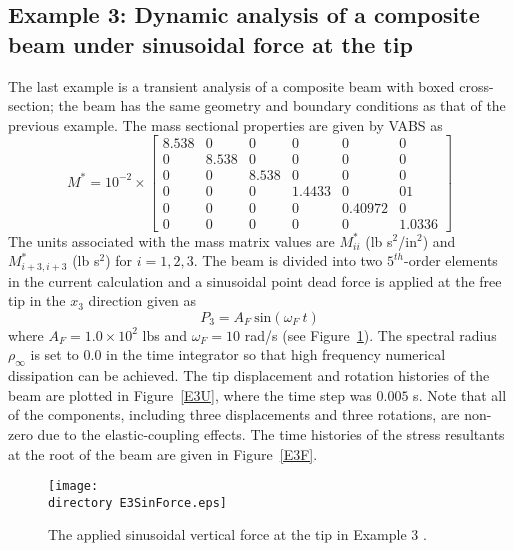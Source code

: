 \subsection{Example 3: Dynamic analysis of a composite beam under sinusoidal force at the tip}

The last example is a transient analysis of a composite beam with boxed
cross-section; the beam has the same
geometry and boundary conditions as that of the previous example. The mass
sectional properties are given by VABS \cite{Yu-etal:2002,Wang-Yu:2012} as
\begin{equation}
    \label{E3Mass}
    M^* = 10^{-2} \times \begin{bmatrix}
	8.538 & 0     & 0     & 0      & 0      & 0      \\
	0       & 8.538 & 0     & 0      & 0      & 0      \\
	0       & 0     & 8.538 & 0      & 0      & 0      \\
	0       & 0     & 0     & 1.4433  & 0  & 01 \\
	0       & 0     & 0     & 0  & 0.40972  &0 \\
	0       & 0     & 0     & 0 & 0 & 1.0336
\end{bmatrix}    
\end{equation}
The units associated with the mass matrix values are $M_{ii}^*$ (lb s$^2$/in$^2$) and $M_{i+3,i+3}^*$ (lb s$^2$) for $i = 1,2,3$. The beam is divided into two $5^{th}$-order elements in the current calculation and a sinusoidal point dead force is applied at the free tip in the $x_3$ direction given as
\begin{equation}
    \label{E3AppliedForce}
    P_3 = A_F~\text{sin}(\omega_F~t)
\end{equation}
where $A_F = 1.0 \times 10^2$ lbs and $\omega_F = 10$ rad/s (see
Figure~\ref{E3SinForce}). 
The spectral radius $\rho_\infty$ is set to $0.0$ in the time integrator so that high frequency numerical dissipation can be achieved. The tip displacement and rotation histories of the beam are plotted in
Figure~\ref{E3U}, where the time step was $0.005$ s. Note that all of the components, including three displacements and three rotations, are non-zero due to the elastic-coupling effects. The time histories of the stress resultants at the root of the beam are given in Figure~\ref{E3F}.
\begin{figure}
    \centering
    \texttt{[image: \\directory E3SinForce.eps]}
    \caption{The applied sinusoidal vertical force at the tip in Example 3 .}
    \label{E3SinForce}
\end{figure}


